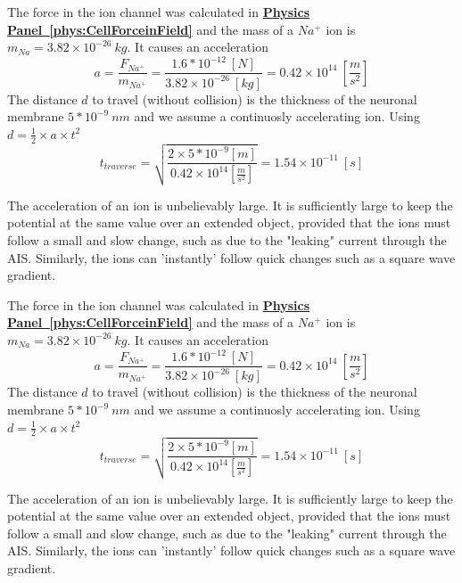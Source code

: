 \ifx\magyar\undefined
{}
{
The force in the ion channel was calculated in
\textbf{\hyperlink{phys:CellForceinField}{Physics Panel~\ref{phys:CellForceinField}}}
\noindent
and the mass of a $Na^+$ ion is $m_{Na} = 3.82\times 10^{-26}\ kg$.
It causes an acceleration
\begin{equation}
a=\frac{F_{Na^+}}{m_{Na^+}} = \frac{1.6*10^{-12}\ [N]}{ 3.82\times 10^{-26}\ [kg]} =
0.42 \times 10^{14}\ [\frac{m}{s^{2}}]
\label{eq:Physics-RushInAceleration}
\end{equation}
\noindent
The distance $d$ to travel (without collision) is the thickness of the neuronal membrane $5*10^{-9}\ nm$
and we assume a continuosly accelerating ion. Using $d=\frac{1}{2}\times a\times t^2$
\begin{equation}
t_{traverse} = \sqrt{\frac{2\times 5*10^{-9} [m]}{0.42\times 10^{14} [\frac{m}{s^{2}}]}} = 1.54\times 10^{-11}\ [s]
\end{equation}

The acceleration of an ion is unbelievably large. It is sufficiently large to keep the potential at the same value
over an extended object,
provided that the ions must follow a small and slow change, such as due to the
"leaking" current through the
\gls{AIS}.
Similarly, the ions can 'instantly' follow quick changes such as
a square wave gradient.
}

\else

{
The force in the ion channel was calculated in
\textbf{\hyperlink{phys:CellForceinField}{Physics Panel~\ref{phys:CellForceinField}}}
\noindent
and the mass of a $Na^+$ ion is $m_{Na} = 3.82\times 10^{-26}\ kg$.
It causes an acceleration
\begin{equation}
a=\frac{F_{Na^+}}{m_{Na^+}} = \frac{1.6*10^{-12}\ [N]}{ 3.82\times 10^{-26}\ [kg]} =
0.42 \times 10^{14}\ [\frac{m}{s^{2}}]
\label{eq:Physics-RushInAceleration}
\end{equation}
\noindent
The distance $d$ to travel (without collision) is the thickness of the neuronal membrane $5*10^{-9}\ nm$
and we assume a continuosly accelerating ion. Using $d=\frac{1}{2}\times a\times t^2$
\begin{equation}
t_{traverse} = \sqrt{\frac{2\times 5*10^{-9} [m]}{0.42\times 10^{14} [\frac{m}{s^{2}}]}} = 1.54\times 10^{-11}\ [s]
\end{equation}

The acceleration of an ion is unbelievably large. It is sufficiently large to keep the potential at the same value
over an extended object,
provided that the ions must follow a small and slow change, such as due to the
"leaking" current through the
\gls{AIS}.
Similarly, the ions can 'instantly' follow quick changes such as
a square wave gradient.
}

